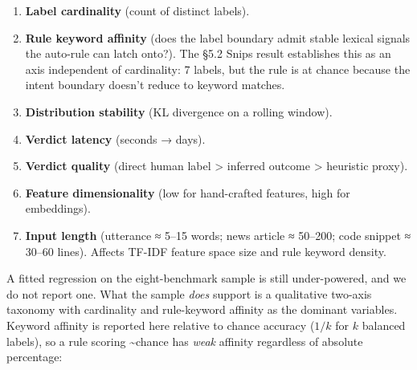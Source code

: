 \begin{enumerate}
\def\labelenumi{\arabic{enumi}.}
\tightlist
\item
  \textbf{Label cardinality} (count of distinct labels).
\item
  \textbf{Rule keyword affinity} (does the label boundary admit stable
  lexical signals the auto-rule can latch onto?). The §5.2 Snips result
  establishes this as an axis independent of cardinality: 7 labels, but
  the rule is at chance because the intent boundary doesn't reduce to
  keyword matches.
\item
  \textbf{Distribution stability} (KL divergence on a rolling window).
\item
  \textbf{Verdict latency} (seconds → days).
\item
  \textbf{Verdict quality} (direct human label \textgreater{} inferred
  outcome \textgreater{} heuristic proxy).
\item
  \textbf{Feature dimensionality} (low for hand-crafted features, high
  for embeddings).
\item
  \textbf{Input length} (utterance ≈ 5--15 words; news article ≈
  50--200; code snippet ≈ 30--60 lines). Affects TF-IDF feature space
  size and rule keyword density.
\end{enumerate}

A fitted regression on the eight-benchmark sample is still
under-powered, and we do not report one. What the sample \emph{does}
support is a qualitative two-axis taxonomy with cardinality and
rule-keyword affinity as the dominant variables. Keyword affinity is
reported here relative to chance accuracy (\(1/k\) for \(k\) balanced
labels), so a rule scoring \textasciitilde chance has \emph{weak}
affinity regardless of absolute percentage:


